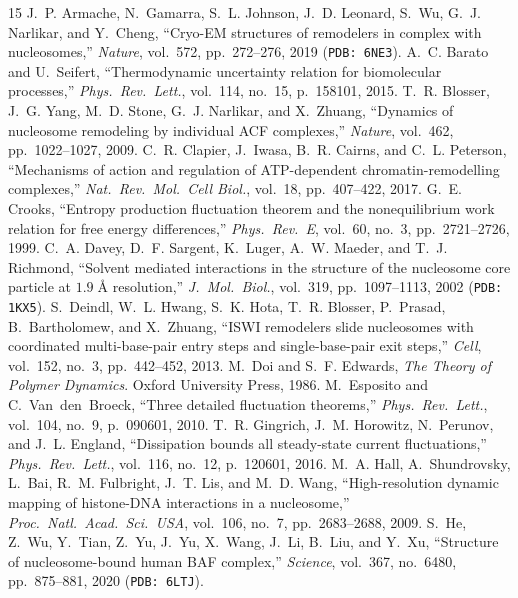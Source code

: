 \documentclass[11pt,a4paper]{article}
\theoremstyle{definition}
\begin{document}
\begin{thebibliography}{15}
 J.~P. Armache, N.~Gamarra, S.~L. Johnson, J.~D. Leonard, S.~Wu, G.~J. Narlikar, and Y.~Cheng, ``Cryo-EM structures of remodelers in complex with nucleosomes,'' \emph{Nature}, vol.~572, pp.~272--276, 2019 (\texttt{PDB: 6NE3}).
 A.~C. Barato and U.~Seifert, ``Thermodynamic uncertainty relation for biomolecular processes,'' \emph{Phys.\ Rev.\ Lett.}, vol.~114, no.~15, p.~158101, 2015.
 T.~R. Blosser, J.~G. Yang, M.~D. Stone, G.~J. Narlikar, and X.~Zhuang, ``Dynamics of nucleosome remodeling by individual ACF complexes,'' \emph{Nature}, vol.~462, pp.~1022--1027, 2009.
 C.~R. Clapier, J.~Iwasa, B.~R. Cairns, and C.~L. Peterson, ``Mechanisms of action and regulation of ATP-dependent chromatin-remodelling complexes,'' \emph{Nat.\ Rev.\ Mol.\ Cell Biol.}, vol.~18, pp.~407--422, 2017.
 G.~E. Crooks, ``Entropy production fluctuation theorem and the nonequilibrium work relation for free energy differences,'' \emph{Phys.\ Rev.\ E}, vol.~60, no.~3, pp.~2721--2726, 1999.
 C.~A. Davey, D.~F. Sargent, K.~Luger, A.~W. Maeder, and T.~J. Richmond, ``Solvent mediated interactions in the structure of the nucleosome core particle at $1.9\;\text{\AA}$ resolution,'' \emph{J.\ Mol.\ Biol.}, vol.~319, pp.~1097--1113, 2002 (\texttt{PDB: 1KX5}).
 S.~Deindl, W.~L. Hwang, S.~K. Hota, T.~R. Blosser, P.~Prasad, B.~Bartholomew, and X.~Zhuang, ``ISWI remodelers slide nucleosomes with coordinated multi-base-pair entry steps and single-base-pair exit steps,'' \emph{Cell}, vol.~152, no.~3, pp.~442--452, 2013.
 M.~Doi and S.~F. Edwards, \emph{The Theory of Polymer Dynamics}. Oxford University Press, 1986.
 M.~Esposito and C.~Van~den~Broeck, ``Three detailed fluctuation theorems,'' \emph{Phys.\ Rev.\ Lett.}, vol.~104, no.~9, p.~090601, 2010.
 T.~R. Gingrich, J.~M. Horowitz, N.~Perunov, and J.~L. England, ``Dissipation bounds all steady-state current fluctuations,'' \emph{Phys.\ Rev.\ Lett.}, vol.~116, no.~12, p.~120601, 2016.
 M.~A. Hall, A.~Shundrovsky, L.~Bai, R.~M. Fulbright, J.~T. Lis, and M.~D. Wang, ``High-resolution dynamic mapping of histone-DNA interactions in a nucleosome,'' \emph{Proc.\ Natl.\ Acad.\ Sci.\ USA}, vol.~106, no.~7, pp.~2683--2688, 2009.
 S.~He, Z.~Wu, Y.~Tian, Z.~Yu, J.~Yu, X.~Wang, J.~Li, B.~Liu, and Y.~Xu, ``Structure of nucleosome-bound human BAF complex,'' \emph{Science}, vol.~367, no.~6480, pp.~875--881, 2020 (\texttt{PDB: 6LTJ}).

\end{thebibliography}
\end{document}
